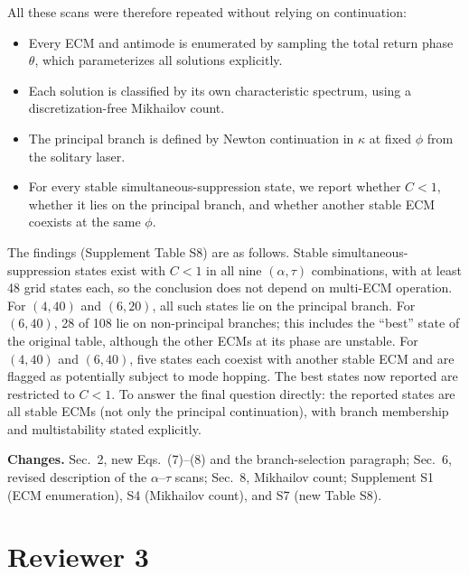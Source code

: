 \documentclass[11pt]{article}
\newcommand{\chg}{\par\noindent\textbf{Changes.} }
\begin{document}
All these scans were therefore repeated without relying on continuation:
\begin{itemize}
\item Every ECM and antimode is enumerated by sampling the total return phase $\theta$, which parameterizes all solutions explicitly.
\item Each solution is classified by its own characteristic spectrum, using a discretization-free Mikhailov count.
\item The principal branch is defined by Newton continuation in $\kappa$ at fixed $\phi$ from the solitary laser.
\item For every stable simultaneous-suppression state, we report whether $C<1$, whether it lies on the principal branch, and whether another stable ECM coexists at the same $\phi$.
\end{itemize}

The findings (Supplement Table S8) are as follows. Stable simultaneous-suppression states exist with $C<1$ in all nine $(\alpha,\tau)$ combinations, with at least 48 grid states each, so the conclusion does not depend on multi-ECM operation. For $(4,40)$ and $(6,20)$, all such states lie on the principal branch. For $(6,40)$, 28 of 108 lie on non-principal branches; this includes the ``best'' state of the original table, although the other ECMs at its phase are unstable. For $(4,40)$ and $(6,40)$, five states each coexist with another stable ECM and are flagged as potentially subject to mode hopping. The best states now reported are restricted to $C<1$. To answer the final question directly: the reported states are all stable ECMs (not only the principal continuation), with branch membership and multistability stated explicitly.
\chg Sec.~2, new Eqs.~(7)--(8) and the branch-selection paragraph; Sec.~6, revised description of the $\alpha$--$\tau$ scans; Sec.~8, Mikhailov count; Supplement S1 (ECM enumeration), S4 (Mikhailov count), and S7 (new Table S8).

\section*{Reviewer 3}
\end{document}
